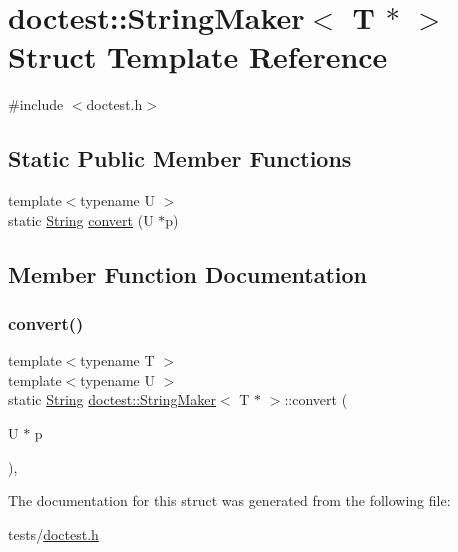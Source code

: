 \hypertarget{structdoctest_1_1StringMaker_3_01T_01_5_01_4}{}\section{doctest\+:\+:String\+Maker$<$ T $\ast$ $>$ Struct Template Reference}
\label{structdoctest_1_1StringMaker_3_01T_01_5_01_4}


{\ttfamily \#include $<$doctest.\+h$>$}

\subsection*{Static Public Member Functions}
\begin{DoxyCompactItemize}
\item 
{\footnotesize template$<$typename U $>$ }\\static \hyperlink{classdoctest_1_1String}{String} \hyperlink{structdoctest_1_1StringMaker_3_01T_01_5_01_4_a79dfd2e72f48a1d9941b924d6ac23104}{convert} (U $\ast$p)
\end{DoxyCompactItemize}


\subsection{Member Function Documentation}
\mbox{\label{structdoctest_1_1StringMaker_3_01T_01_5_01_4_a79dfd2e72f48a1d9941b924d6ac23104}} 
\subsubsection{\texorpdfstring{convert()}{convert()}}
{\footnotesize\ttfamily template$<$typename T $>$ \\
template$<$typename U $>$ \\
static \hyperlink{classdoctest_1_1String}{String} \hyperlink{structdoctest_1_1StringMaker}{doctest\+::\+String\+Maker}$<$ T $\ast$ $>$\+::convert (\begin{DoxyParamCaption}\item[{U $\ast$}]{p }\end{DoxyParamCaption})\hspace{0.3cm}{\ttfamily [inline]}, {\ttfamily [static]}}



The documentation for this struct was generated from the following file\+:\begin{DoxyCompactItemize}
\item 
tests/\hyperlink{doctest_8h}{doctest.\+h}\end{DoxyCompactItemize}
